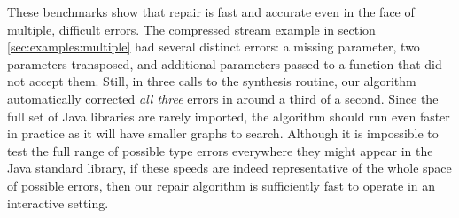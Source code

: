 These benchmarks show that repair is fast and accurate even in the face of multiple, difficult errors. The compressed stream example in section \ref{sec:examples:multiple} had several distinct errors: a missing parameter, two parameters transposed, and additional parameters passed to a function that did not accept them. Still, in three calls to the synthesis routine, our algorithm automatically corrected \textit{all three} errors in around a third of a second. Since the full set of Java libraries are rarely imported, the algorithm should run even faster in practice as it will have smaller graphs to search. Although it is impossible to test the full range of possible type errors everywhere they might appear in the Java standard library, if these speeds are indeed representative of the whole space of possible errors, then our repair algorithm is sufficiently fast to operate in an interactive setting.
